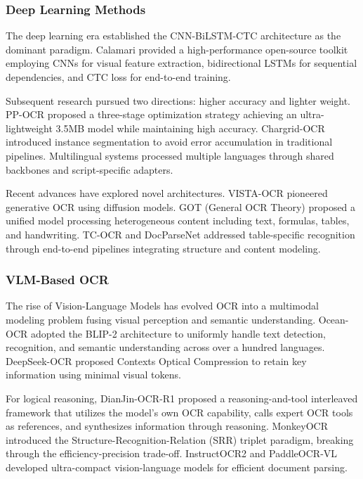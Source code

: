 \subsubsection{Deep Learning Methods}

The deep learning era established the CNN-BiLSTM-CTC architecture as the dominant paradigm. Calamari \cite{wick2018calamari} provided a high-performance open-source toolkit employing CNNs for visual feature extraction, bidirectional LSTMs for sequential dependencies, and CTC loss for end-to-end training.

Subsequent research pursued two directions: higher accuracy and lighter weight. PP-OCR \cite{du2020ppocr} proposed a three-stage optimization strategy achieving an ultra-lightweight 3.5MB model while maintaining high accuracy. Chargrid-OCR \cite{keremberke2021chargrid} introduced instance segmentation to avoid error accumulation in traditional pipelines. Multilingual systems \cite{pham2021multiplexed} processed multiple languages through shared backbones and script-specific adapters.

Recent advances have explored novel architectures. VISTA-OCR \cite{vista_ocr_2024} pioneered generative OCR using diffusion models. GOT (General OCR Theory) \cite{got_ocr_2024} proposed a unified model processing heterogeneous content including text, formulas, tables, and handwriting. TC-OCR \cite{chen2023tcocr} and DocParseNet \cite{liu2023docparsenet} addressed table-specific recognition through end-to-end pipelines integrating structure and content modeling.

\subsubsection{VLM-Based OCR}

The rise of Vision-Language Models has evolved OCR into a multimodal modeling problem fusing visual perception and semantic understanding. Ocean-OCR \cite{ocean_ocr_2024} adopted the BLIP-2 architecture to uniformly handle text detection, recognition, and semantic understanding across over a hundred languages. DeepSeek-OCR \cite{deepseek2025ocr} proposed Contexts Optical Compression to retain key information using minimal visual tokens.

For logical reasoning, DianJin-OCR-R1 \cite{li2025dianjin} proposed a reasoning-and-tool interleaved framework that utilizes the model's own OCR capability, calls expert OCR tools as references, and synthesizes information through reasoning. MonkeyOCR \cite{li2025monkeyocr} introduced the Structure-Recognition-Relation (SRR) triplet paradigm, breaking through the efficiency-precision trade-off. InstructOCR2 \cite{chen2025instructocr2} and PaddleOCR-VL \cite{du2025paddleocrvl} developed ultra-compact vision-language models for efficient document parsing.

